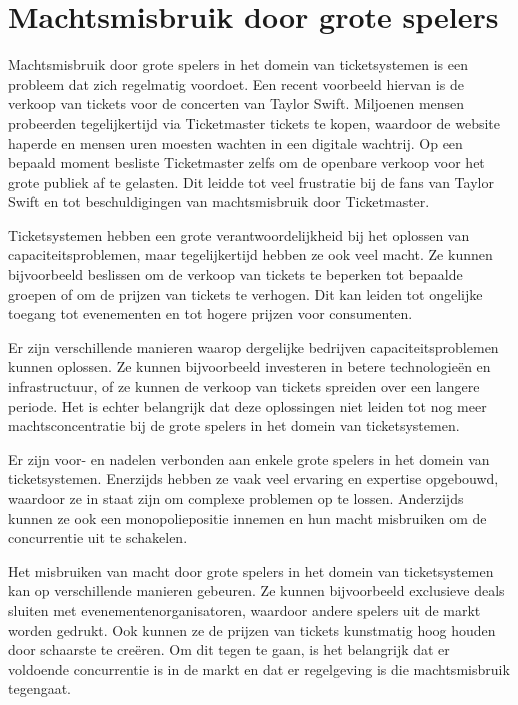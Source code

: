 
\section{Machtsmisbruik door grote spelers}

Machtsmisbruik door grote spelers in het domein van ticketsystemen is een probleem dat zich regelmatig voordoet. 
Een recent voorbeeld hiervan is de verkoop van tickets voor de concerten van Taylor Swift. 
Miljoenen mensen probeerden tegelijkertijd via Ticketmaster tickets te kopen, 
waardoor de website haperde en mensen uren moesten wachten in een digitale wachtrij. 
Op een bepaald moment besliste Ticketmaster zelfs om de openbare verkoop voor het grote publiek af te gelasten. 
Dit leidde tot veel frustratie bij de fans van Taylor Swift en tot beschuldigingen van machtsmisbruik door Ticketmaster.

Ticketsystemen hebben een grote verantwoordelijkheid bij het oplossen van capaciteitsproblemen, 
maar tegelijkertijd hebben ze ook veel macht. 
Ze kunnen bijvoorbeeld beslissen om de verkoop van tickets te beperken tot bepaalde groepen of om de prijzen van tickets te verhogen. 
Dit kan leiden tot ongelijke toegang tot evenementen en tot hogere prijzen voor consumenten.

Er zijn verschillende manieren waarop dergelijke bedrijven capaciteitsproblemen kunnen oplossen. 
Ze kunnen bijvoorbeeld investeren in betere technologieën en infrastructuur, 
of ze kunnen de verkoop van tickets spreiden over een langere periode. 
Het is echter belangrijk dat deze oplossingen niet leiden tot nog meer machtsconcentratie bij de grote spelers in het domein van ticketsystemen.

Er zijn voor- en nadelen verbonden aan enkele grote spelers in het domein van ticketsystemen. 
Enerzijds hebben ze vaak veel ervaring en expertise opgebouwd, 
waardoor ze in staat zijn om complexe problemen op te lossen. 
Anderzijds kunnen ze ook een monopoliepositie innemen en hun macht misbruiken om de concurrentie uit te schakelen.

Het misbruiken van macht door grote spelers in het domein van ticketsystemen kan op verschillende manieren gebeuren. 
Ze kunnen bijvoorbeeld exclusieve deals sluiten met evenementenorganisatoren, 
waardoor andere spelers uit de markt worden gedrukt. 
Ook kunnen ze de prijzen van tickets kunstmatig hoog houden door schaarste te creëren. 
Om dit tegen te gaan, 
is het belangrijk dat er voldoende concurrentie is in de markt en dat er regelgeving is die machtsmisbruik tegengaat.

